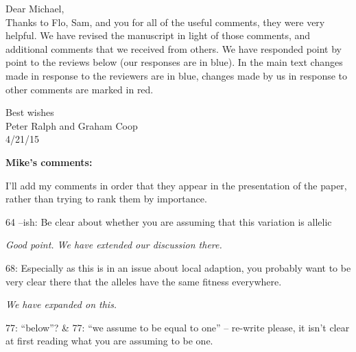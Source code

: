 \documentclass[12pt,letterpaper]{article}
\newcommand{\response}[1]{\emph{ \color{blue} #1}}
\begin{document}
Dear Michael,\\
Thanks to Flo, Sam, and you for all of the useful comments, they were very helpful. We have revised the manuscript in light of those comments, and additional comments that we received from others. We have responded point by point to the reviews below (our responses are in blue). In the main text changes made in response to the reviewers are in blue, changes made by us in response to other comments are marked in red.

 
Best wishes\\
Peter Ralph and Graham Coop\\
4/21/15
\newpage 









{\bf Mike's comments:}

I'll add my comments in order that they appear in the presentation of the paper, rather than trying to rank them by importance.

64 --ish: Be clear about whether you are assuming that this variation is allelic

\response{Good point. We have extended our discussion there. }


68: Especially as this is in an issue about local adaption, you probably want to be very clear there that the alleles have the same fitness everywhere.

\response{We have expanded on this.}

77: ``below''? \& 77: ``we assume to be equal to one'' -- re-write please, it isn't clear at first reading what you are assuming to be one.
\end{document}
